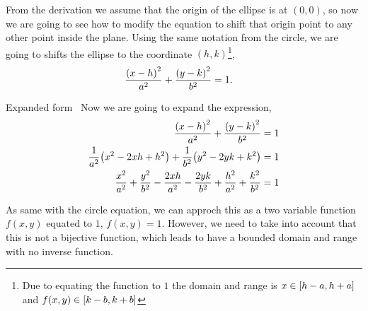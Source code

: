 \documentclass[../main-notes.tex]{subfiles}
\begin{document}
From the derivation we assume that the origin of the ellipse is at $(0,0)$, so now we are going to see how to modify the equation to shift that origin point to any other point inside the plane.
Using the same notation from the circle, we are going to shifts the ellipse to the coordinate $(h,k)$\footnote{Due to equating the function to $1$ the domain and range is $x\in\qty[h-a,h+a]$ and $f(x,y)\in\qty[k-b,k+b]$},
\begin{align*}
    \frac{\qty(x-h)^2}{a^2} + \frac{\qty(y-k)^2}{b^2} &= 1.
\end{align*}

\begin{note}{Expanded form}{~}
Now we are going to expand the expression,
\begin{align*}
    \frac{\qty(x-h)^2}{a^2} + \frac{\qty(y-k)^2}{b^2} &= 1 \\
    \frac{1}{a^2}\qty(x^2-2xh+h^2) + \frac{1}{b^2}\qty(y^2-2yk+k^2) &= 1 \\
    \frac{x^2}{a^2} + \frac{y^2}{b^2}
    -\frac{2xh}{a^2} -\frac{2yk}{b^2}
    +\frac{h^2}{a^2} + \frac{k^2}{b^2} &= 1
\end{align*}

As same with the circle equation, we can approch this as a two variable function $f(x,y)$ equated to $1$, $f(x,y)=1$.
However, we need to take into account that this is not a bijective function, which leads to have a bounded domain and range with no inverse function.
\end{note}


\end{document}
